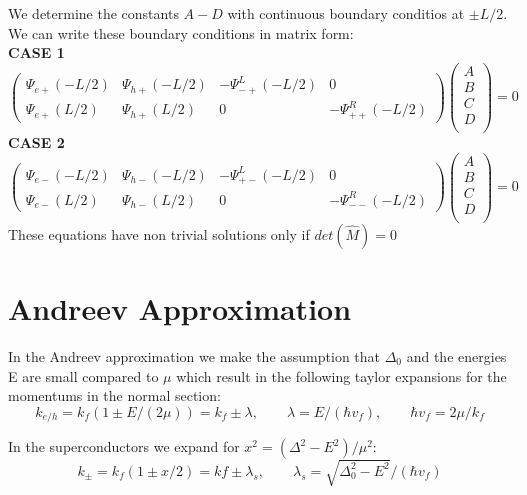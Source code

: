 \documentclass[a4paper,11pt]{article}
\begin{document}
We determine the constants $A-D$ with continuous boundary conditios at $\pm L/2$. We can write these boundary conditions in matrix form: \\
{\bf CASE 1}
\begin{equation}
 \left( \begin{array}{cccc}
  \Psi_{e+}(-L/2) & \Psi_{h+}(-L/2) & -\Psi^L_{-+}(-L/2) & 0\\
  \Psi_{e+}(L/2) & \Psi_{h+}(L/2) & 0 & -\Psi^R_{++}(-L/2)
 \end{array} \right)
 \left( \begin{array}{cccc}
A \\
B \\
C \\
D \\
 \end{array} \right) = 0
\end{equation}
{\bf CASE 2}
\begin{equation}
 \left( \begin{array}{cccc}
  \Psi_{e-}(-L/2) & \Psi_{h-}(-L/2) & -\Psi^L_{+-}(-L/2) & 0\\
  \Psi_{e-}(L/2) & \Psi_{h-}(L/2) & 0 & -\Psi^R_{--}(-L/2)
 \end{array} \right)
 \left( \begin{array}{cccc}
A \\
B \\
C \\
D \\
 \end{array} \right) = 0
\end{equation}
These equations have non trivial solutions only if $det(\hat{M})=0$

\section*{Andreev Approximation}
In the Andreev approximation we make the assumption that $\Delta_0$ and the energies E are small compared to $\mu$ which result in the following taylor expansions for the momentums in the normal section: \\
\begin{equation}
k_{e/h} = k_f(1 \pm E/(2\mu)) = k_f \pm \lambda,\quad\quad\lambda = E/(\hbar v_f),\quad\quad \hbar v_f = 2\mu/k_f
\end{equation}

In the superconductors we expand for $x^2 = (\Delta^2-E^2)/\mu^2$: \\
\begin{equation}
k_{\pm} = k_f(1\pm x/2) = kf \pm \lambda_s,\quad\quad \lambda_s = \sqrt{\Delta_0^2-E^2}/(\hbar v_f)
\end{equation}
\end{document}
